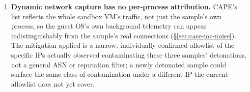 \begin{enumerate}
\item \label{lim:network-attribution} \textbf{Dynamic network capture
  has no per-process attribution.}
  CAPE's  list reflects the whole sandbox VM's
  traffic, not just the sample's own process, so the guest OS's own
  background telemetry can appear indistinguishably from the sample's
  real connections (\S\ref{sec:case-ioc-noise}). The mitigation applied
  is a narrow, individually-confirmed allowlist of the specific IPs
  actually observed contaminating these three samples' detonations, not
  a general ASN or reputation filter; a newly detonated sample could
  surface the same class of contamination under a different IP the
  current allowlist does not yet cover.

\end{enumerate}
